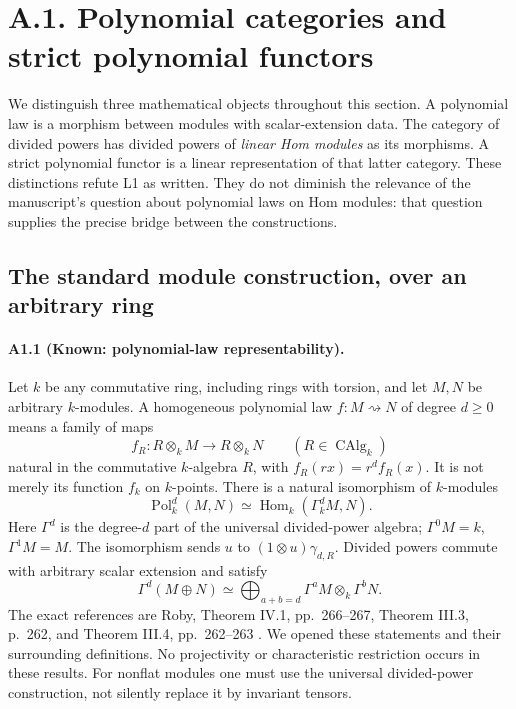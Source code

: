 \section{A.1. Polynomial categories and strict polynomial functors}
\label{sec:A1}

We distinguish three mathematical objects throughout this section. A
polynomial law is a morphism between modules with scalar-extension data.
The category of divided powers has divided powers of \emph{linear Hom
modules} as its morphisms. A strict polynomial functor is a linear
representation of that latter category. These distinctions refute L1 as
written. They do not diminish the relevance of the manuscript's question
about polynomial laws on Hom modules: that question supplies the precise
bridge between the constructions.

\subsection{The standard module construction, over an arbitrary ring}

\paragraph{A1.1 (Known: polynomial-law representability).}
Let $k$ be any commutative ring, including rings with torsion, and let $M,N$
be arbitrary $k$-modules. A homogeneous polynomial law $f:M\rightsquigarrow
N$ of degree $d\geq0$ means a family of maps
\[
 f_R:R\otimes_k M\longrightarrow R\otimes_k N
 \qquad(R\in\operatorname{CAlg}_k)
\]
natural in the commutative $k$-algebra $R$, with $f_R(rx)=r^d f_R(x)$.
It is not merely its function $f_k$ on $k$-points. There is a natural
isomorphism of $k$-modules
\[
 \operatorname{Pol}^d_k(M,N)
 \simeq\operatorname{Hom}_k(\Gamma^d_k M,N).
 \tag{A1.1}
\]
Here $\Gamma^d$ is the degree-$d$ part of the universal divided-power
algebra; $\Gamma^0 M=k$, $\Gamma^1M=M$. The isomorphism sends $u$ to
$(1\otimes u)\gamma_{d,R}$. Divided powers commute with arbitrary scalar
extension and satisfy
\[
 \Gamma^d(M\oplus N)\simeq
 \bigoplus_{a+b=d}\Gamma^a M\otimes_k\Gamma^b N.
 \tag{A1.2}
\]
The exact references are Roby, Theorem IV.1, pp.~266--267,
Theorem III.3, p.~262, and Theorem III.4, pp.~262--263
\cite{Roby1963}. We opened these statements and their surrounding
definitions. No projectivity or characteristic restriction occurs in
these results. For nonflat modules one must use the universal
divided-power construction, not silently replace it by invariant tensors.

